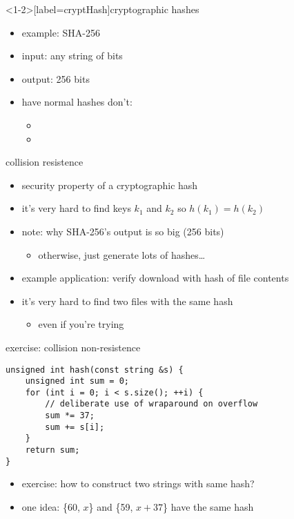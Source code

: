 \begin{frame}<1-2>[label=cryptHash]{cryptographic hashes}
\begin{itemize}
\item example: SHA-256
\item input: any string of bits
\item output: 256 bits
\vspace{.5cm}
\item have  normal hashes don't:
\begin{itemize}
    \item {}
    \item {}
\end{itemize}
\end{itemize}
\end{frame}

\begin{frame}{collision resistence}
\begin{itemize}
\item security property of a cryptographic hash
\item it's very  hard to find keys $k_1$ and $k_2$ so $h(k_1) = h(k_2)$
\vspace{.5cm}
\item note: why SHA-256's output is so big (256 bits)
    \begin{itemize}
    \item otherwise, just generate lots of hashes\ldots
    \end{itemize}
\item example application: verify download with hash of file contents
\item it's very hard to find two files with the same hash
\begin{itemize}
\item even if you're trying
\end{itemize}
\end{itemize}
\end{frame}

\begin{frame}[fragile,label=colNonRes]{exercise: collision non-resistence}
\begin{lstlisting}
unsigned int hash(const string &s) {
    unsigned int sum = 0;
    for (int i = 0; i < s.size(); ++i) {
        // deliberate use of wraparound on overflow
        sum *= 37;
        sum += s[i];
    }
    return sum;
}
\end{lstlisting}
\begin{itemize}
\item exercise: how to construct two strings with same hash?
\item<2-> one idea: \{60, $x$\} and \{59, $x+37$\} have the same hash
\end{itemize}
\end{frame}

